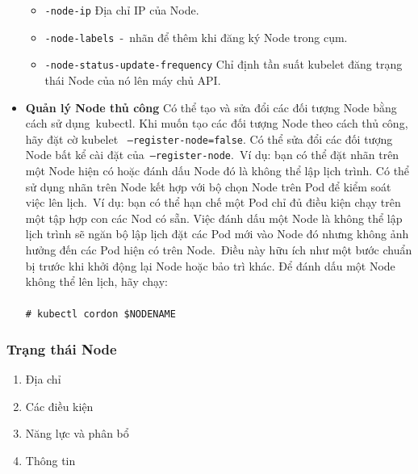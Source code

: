 \documentclass[12pt,a4paper]{report}
\newcommand{\shellcmd}[1]{\\\indent\indent\texttt{\footnotesize\# #1}\\}
\newcommand{\shellcmd}[1]{\\\indent\indent\texttt{\footnotesize\# #1}\\}
\begin{document}
\begin{itemize}
\begin{itemize}
			\item \texttt{-node-ip} Địa chỉ IP của Node.
			\item \texttt{-node-labels} - nhãn để thêm khi đăng ký Node trong cụm.
			\item \texttt{-node-status-update-frequency} Chỉ định tần suất kubelet đăng trạng thái Node của nó lên máy chủ API.
		\end{itemize}
		\smallskip
		\item \textbf{Quản lý Node thủ công}
		\smallskip
		\subitem Có thể tạo và sửa đổi các đối tượng Node bằng cách sử dụng kubectl.
		\smallskip
		\subitem Khi muốn tạo các đối tượng Node theo cách thủ công, hãy đặt cờ kubelet     \texttt{--register-node=false}.
		\smallskip
		\subitem Có thể sửa đổi các đối tượng Node bất kể cài đặt của \texttt{--register-node}. Ví dụ: bạn có thể đặt nhãn trên một Node hiện có hoặc đánh dấu Node đó là không thể lập lịch trình.
		\smallskip
		\subitem Có thể sử dụng nhãn trên Node kết hợp với bộ chọn Node trên Pod để kiểm soát việc lên lịch. Ví dụ: bạn có thể hạn chế một Pod chỉ đủ điều kiện chạy trên một tập hợp con các Nod có sẵn.
		\smallskip
		\subitem Việc đánh dấu một Node là không thể lập lịch trình sẽ ngăn bộ lập lịch đặt các Pod mới vào Node đó nhưng không ảnh hưởng đến các Pod hiện có trên Node. Điều này hữu ích như một bước chuẩn bị trước khi khởi động lại Node hoặc bảo trì khác.
		\subitem Để đánh dấu một Node không thể lên lịch, hãy chạy:\\
		\shellcmd{kubectl cordon \$NODENAME}
	\end{itemize}
	\subsubsection{Trạng thái Node}
	
	\hspace{1cm}{Trạng thái của Node chứa các thông tin sau:}
	\begin{enumerate}
		\item Địa chỉ
		\item Các điều kiện
		\item Năng lực và phân bổ
		\item Thông tin
	\end{enumerate}
	\smallskip
	
\end{document}

